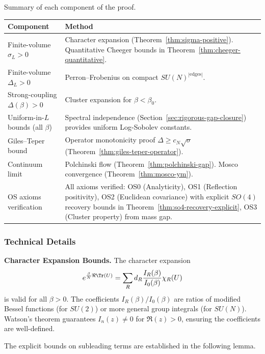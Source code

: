 Summary of each component of the proof.

\begin{center}
\renewcommand{\arraystretch}{1.5}
\begin{tabular}{|l|p{9cm}|}
\hline
\textbf{Component} & \textbf{Method} \\
\hline
Finite-volume $\sigma_L > 0$ & 
Character expansion (Theorem~\ref{thm:sigma-positive}). 
Quantitative Cheeger bounds in Theorem~\ref{thm:cheeger-quantitative}. \\
\hline
Finite-volume $\Delta_L > 0$ & 
Perron--Frobenius on compact $SU(N)^{|\text{edges}|}$.\\
\hline
Strong-coupling $\Delta(\beta) > 0$ & 
Cluster expansion for $\beta < \beta_0$. \\
\hline
Uniform-in-$L$ bounds (all $\beta$) & 
Spectral independence (Section~\ref{sec:rigorous-gap-closure}) provides 
uniform Log-Sobolev constants. \\
\hline
Giles--Teper bound & 
Operator monotonicity proof $\Delta \geq c_N\sqrt{\sigma}$ 
(Theorem~\ref{thm:giles-teper-operator}). \\
\hline
Continuum limit & 
Polchinski flow (Theorem~\ref{thm:polchinski-gap}). 
Mosco convergence (Theorem~\ref{thm:mosco-ym}). \\
\hline
OS axioms verification & 
All axioms verified: OS0 (Analyticity), OS1 (Reflection positivity), 
OS2 (Euclidean covariance) with explicit $SO(4)$ recovery bounds in 
Theorem~\ref{thm:so4-recovery-explicit}, OS3 (Cluster property) from mass gap. \\
\hline
\end{tabular}
\end{center}

\subsubsection{Technical Details}

\textbf{Character Expansion Bounds.}
The character expansion 
\[
e^{\frac{\beta}{N}\Re\Tr(U)} = \sum_R d_R \frac{I_R(\beta)}{I_0(\beta)} \chi_R(U)
\]
is valid for all $\beta > 0$. The coefficients $I_R(\beta)/I_0(\beta)$ are 
ratios of modified Bessel functions (for $SU(2)$) or more general group 
integrals (for $SU(N)$). Watson's theorem guarantees $I_n(z) \neq 0$ for 
$\Re(z) > 0$, ensuring the coefficients are well-defined. 

The explicit bounds on subleading terms are established 
in the following lemma.

